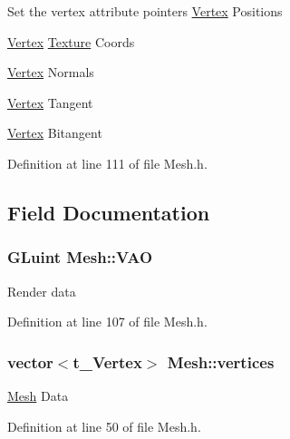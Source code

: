 Set the vertex attribute pointers \hyperlink{struct_vertex}{Vertex} Positions

\hyperlink{struct_vertex}{Vertex} \hyperlink{struct_texture}{Texture} Coords

\hyperlink{struct_vertex}{Vertex} Normals

\hyperlink{struct_vertex}{Vertex} Tangent

\hyperlink{struct_vertex}{Vertex} Bitangent 

Definition at line 111 of file Mesh.\+h.



\subsection{Field Documentation}
\subsubsection[{\texorpdfstring{V\+AO}{VAO}}]{\setlength{\rightskip}{0pt plus 5cm}G\+Luint Mesh\+::\+V\+AO}\hypertarget{class_mesh_a09b989b9d4df8ae595d7e80e091a4a5b}{}\label{class_mesh_a09b989b9d4df8ae595d7e80e091a4a5b}
Render data 

Definition at line 107 of file Mesh.\+h.

\subsubsection[{\texorpdfstring{vertices}{vertices}}]{\setlength{\rightskip}{0pt plus 5cm}vector$<${\bf t\+\_\+\+Vertex}$>$ Mesh\+::vertices}\hypertarget{class_mesh_ae065969fc6d4864eca63f57d14030a5d}{}\label{class_mesh_ae065969fc6d4864eca63f57d14030a5d}
\hyperlink{class_mesh}{Mesh} Data 

Definition at line 50 of file Mesh.\+h.


